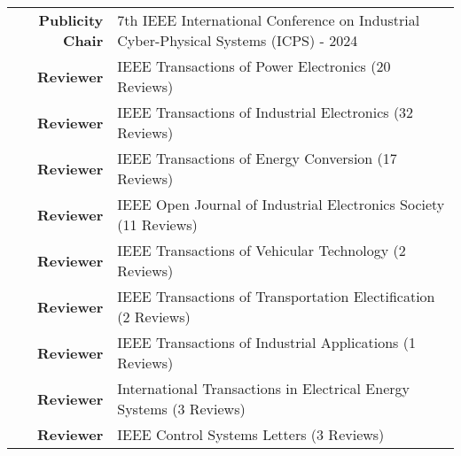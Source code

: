 \documentclass[10pt,letter]{article}
\begin{document}
\begin{small}
{\renewcommand{\arraystretch}{1.25}
\begin{tabular}{rl}
 \textbf{Publicity Chair} & 7th IEEE International Conference on Industrial Cyber-Physical Systems (ICPS) - 2024 \\
 \textbf{Reviewer} & IEEE Transactions of Power Electronics (20 Reviews) \\
 \textbf{Reviewer} & IEEE Transactions of Industrial Electronics (32 Reviews) \\
 \textbf{Reviewer} & IEEE Transactions of Energy Conversion (17 Reviews) \\
 \textbf{Reviewer} & IEEE Open Journal of Industrial Electronics Society (11 Reviews) \\
 \textbf{Reviewer} & IEEE Transactions of Vehicular Technology (2 Reviews) \\
 \textbf{Reviewer} & IEEE Transactions of Transportation Electification (2 Reviews) \\
 \textbf{Reviewer} & IEEE Transactions of Industrial Applications (1 Reviews) \\
 \textbf{Reviewer} & International Transactions in Electrical Energy Systems (3 Reviews) \\
 \textbf{Reviewer} & IEEE Control Systems Letters (3 Reviews) \\
\end{tabular}
}



\end{small}
\end{document}

